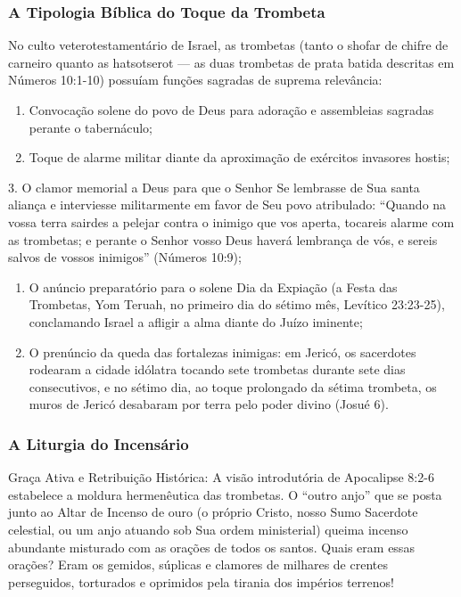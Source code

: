 \documentclass[11pt,a4paper,openany]{book}
\begin{document}
\subsubsection*{A Tipologia Bíblica do Toque da Trombeta}
No culto veterotestamentário de Israel, as trombetas (tanto o shofar de chifre de carneiro quanto as hatsotserot — as duas trombetas de prata batida descritas em Números 10:1-10) possuíam funções sagradas de suprema relevância:
\begin{enumerate}
  \item Convocação solene do povo de Deus para adoração e assembleias sagradas perante o tabernáculo;
  \item Toque de alarme militar diante da aproximação de exércitos invasores hostis;
\end{enumerate}

3. O clamor memorial a Deus para que o Senhor Se lembrasse de Sua santa aliança e interviesse militarmente em favor de Seu povo atribulado: ``Quando na vossa terra sairdes a pelejar contra o inimigo que vos aperta, tocareis alarme com as trombetas; e perante o Senhor vosso Deus haverá lembrança de vós, e sereis salvos de vossos inimigos'' (Números 10:9);
\begin{enumerate}
  \item O anúncio preparatório para o solene Dia da Expiação (a Festa das Trombetas, Yom Teruah, no primeiro dia do sétimo mês, Levítico 23:23-25), conclamando Israel a afligir a alma diante do Juízo iminente;
  \item O prenúncio da queda das fortalezas inimigas: em Jericó, os sacerdotes rodearam a cidade idólatra tocando sete trombetas durante sete dias consecutivos, e no sétimo dia, ao toque prolongado da sétima trombeta, os muros de Jericó desabaram por terra pelo poder divino (Josué 6).
\end{enumerate}



\subsubsection*{A Liturgia do Incensário}
Graça Ativa e Retribuição Histórica:
A visão introdutória de Apocalipse 8:2-6 estabelece a moldura hermenêutica das trombetas. O ``outro anjo'' que se posta junto ao Altar de Incenso de ouro (o próprio Cristo, nosso Sumo Sacerdote celestial, ou um anjo atuando sob Sua ordem ministerial) queima incenso abundante misturado com as orações de todos os santos. Quais eram essas orações? Eram os gemidos, súplicas e clamores de milhares de crentes perseguidos, torturados e oprimidos pela tirania dos impérios terrenos!
\end{document}
